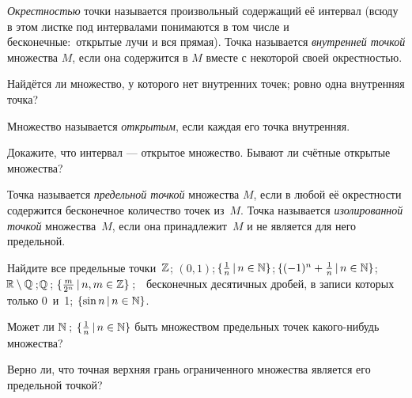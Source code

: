 \documentclass[a4paper, 11pt]{article}
\begin{document}




{\itshape Окрестностью} точки называется произвольный
содержащий её интервал {\small (всюду в этом листке под интервалами
понимаются в том числе и бесконечные:~открытые лучи и вся прямая)}.
Точка называется
{\itshape внутренней точкой} множества $M$, если
она содержится в $M$ вместе с некоторой своей окрестностью.

Найдётся ли множество, у которого
нет внутренних точек;
ровно одна внутренняя точка?

Множество называется {\itshape открытым}, если каждая его точка
внутренняя.

Докажите, что интервал --- открытое множество.
Бывают ли счётные открытые множества?

Точка называется {\itshape предельной точкой} множества $M$,
если в любой её окрестности содержится бесконечное
количество точек из~$M$. Точка называется
{\itshape изолированной точкой} множества~$M$, если она
принадлежит~$M$ и не является для него предельной.

Найдите все предельные точки $\!\!$%
$\!\mathbb{Z}$;
$\!(0,1)$;
$\!\{\frac1n\,|\,n\in\mathbb{N}\}$;
$\!\{(-1)^n+\frac1n\,|\,n\in\mathbb{N}\}$;
$\!\mathbb{R}\setminus\mathbb{Q}$\,;
$\!\!\mathbb{Q}$\,; $\!\!$
$\!\!\{\frac{m}{2^n}\,|\,n,m\in\mathbb{Z}\}$\,; $\!\!$ %
$\!\!$ бесконечных десятичных дробей, в записи которых
только 0~и~1; $\!\!$
$\!\!\{\sin n\,|\,n\in\mathbb{N}\}$.

Может ли
$\mathbb{N}$\,;
$\{\frac1n\,|\,n\in\mathbb{N}\}$
быть множеством предельных точек
какого-нибудь множества?

Верно ли, что %
точная верхняя грань ограниченного множества является его
предельной точкой?
\end{document}
